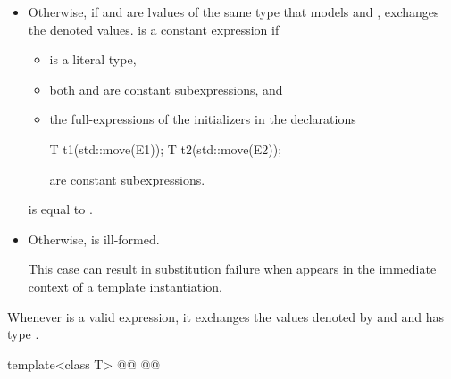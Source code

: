 \begin{addedblock}
\begin{itemize}
\item
  Otherwise, if  and  are lvalues of the
  same type  that models  and
  , exchanges the denoted values.
   is a constant expression if
  \begin{itemize}
  \item {} is a literal type,
  \item both  and  are
    constant subexpressions, and
  \item the full-expressions of the initializers in the declarations
    \begin{codeblock}
    T t1(std::move(E1));
    T t2(std::move(E2));
    \end{codeblock}
    are constant subexpressions.
  \end{itemize}
   is equal to
  .

\item
  Otherwise,  is ill-formed.
  \begin{note}
  This case can result in substitution failure when 
  appears in the immediate context of a template instantiation.
  \end{note}
\end{itemize}

\pnum
\begin{note}
Whenever  is a valid expression, it
exchanges the values denoted by
 and  and has type .
\end{note}
\end{addedblock}

%
\begin{itemdecl}
template<class T>
  @@
  @@
\end{itemdecl}

